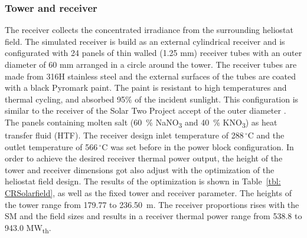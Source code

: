 \documentclass[Master,MEE,english]{twbook}%
\begin{document}
\subsubsection{Tower and receiver}
The receiver collects the concentrated irradiance from the surrounding heliostat field. The simulated receiver is build as an external cylindrical receiver and is configurated with 24 panels of thin walled (1.25 mm) receiver tubes with an outer diameter of 60 mm arranged in a circle around the tower. The receiver tubes are made from 316H stainless steel and the external surfaces of the tubes are coated with a black Pyromark paint. The paint is resistant to high temperatures and thermal cycling, and absorbed 95\% of the incident sunlight. This configuration is similar to the receiver of the  Solar Two Project accept of the outer diameter \cite{Bradshaw2002}. The panels containing molten salt (60~\% NaNO\textsubscript{3} and 40~\% KNO\textsubscript{3}) as heat transfer fluid (HTF). The receiver design inlet temperature of 288$\,^{\circ}\mathrm{C}$ and the outlet temperature of 566$\,^{\circ}\mathrm{C}$ was set before in the power block configuration. In order to achieve the desired receiver thermal power output, the height of the tower and receiver dimensions got also adjust with the optimization of the heliostat field design. The results of the optimization is shown in Table~\ref{tbl: CRSolarfield}, as well as the fixed tower and receiver parameter. The heights of the tower range from 179.77 to 236.50~m. The receiver proportions rises with the SM and the field sizes and results in a receiver thermal power range from 538.8 to 943.0 MW\textsubscript{th}.
\end{document}
